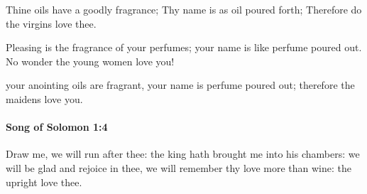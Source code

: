 			\begin{versebox}
					\item[BHS] 
					\item[LXX] 
					\item[ASV] Thine oils have a goodly fragrance; Thy name is as oil poured forth; Therefore do the virgins love thee.
					\item[NIV] Pleasing is the fragrance of your perfumes; your name is like perfume poured out. No wonder the young women love you!
					\item[NRSV] your anointing oils are fragrant, your name is perfume poured out; therefore the maidens love you.
			\end{versebox}

		\paragraph{Song of Solomon 1:4} %
			\label{SONGOFSOLOMON-1-4}

			Draw me, we will run after thee: the king hath brought me into his chambers: we will be glad and rejoice in thee, we will remember thy love more than wine: the upright love thee.

